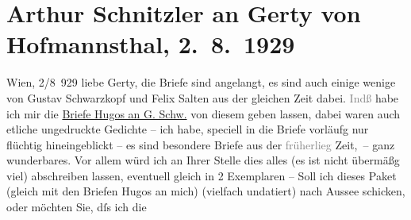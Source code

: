 

         
         \renewcommand{\erwaehntePersonen}{Personen: Gertrude von Hofmannsthal, Hugo von Hofmannsthal, Felix Salten, Gustav Schwarzkopf}
         \renewcommand{\erwaehnteOrte}{Orte: Bad Aussee, Wien}
         \renewcommand{\erwaehnteWerke}{}
               \section[Arthur Schnitzler an Gerty von Hofmannsthal, 2. 8. 1929]{ Arthur Schnitzler an Gerty von Hofmannsthal, 2. 8. 1929}\nopagebreak{}\rehead{ }\begin{ledgroupsized}[t]{13cm}\normalsize\beginnumbering \toendnotes[C]{\smallbreak\pagebreak[2]} 
\pstart
           \raggedleft{}{\pb}Wien, 2/8 929\pend
           \pstart
           liebe Gerty, die Briefe sind angelangt, es sind auch einige wenige
               von Gustav Schwarzkopf und Felix Salten aus der gleichen Zeit dabei. \textcolor{gray}{Indß}
               habe ich mir die \uline{Briefe Hugos an G. Schw.} von diesem geben lassen, dabei waren auch etliche ungedruckte Gedichte – ich
               habe, speciell in die Briefe vorläufg nur flüchtig hineingeblickt – es sind besondere
               Briefe aus der \textcolor{gray}{früherlieg} Zeit, – ganz wunderbares. Vor allem würd
               ich \introOben{}an Ihrer Stelle\introOben{} dies alles (es ist nicht übermäßg viel)
               abschreiben lassen, eventuell gleich in 2 Exemplaren – Soll ich dieses Paket (gleich
               mit den Briefen Hugos an mich) {\pb}(vielfach undatiert) nach Aussee schicken, oder möchten Sie, dſs \introOben{}ich\introOben{} die

\end{ledgroupsized}
